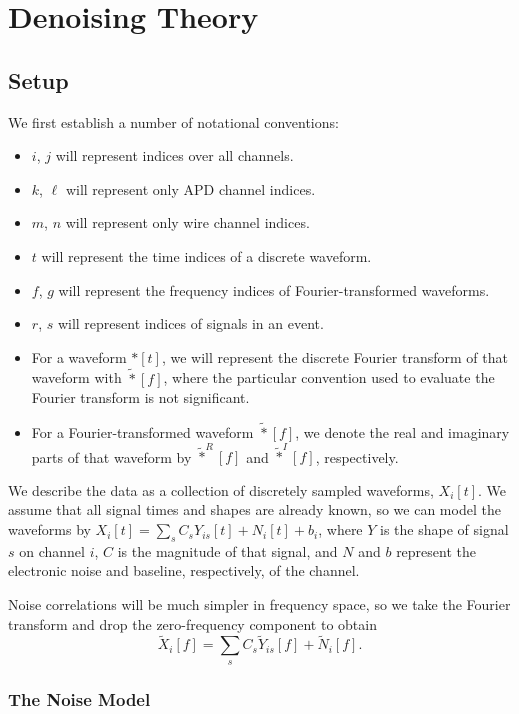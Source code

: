 
\renewcommand{\thechapter}{4}
\chapter{Denoising Theory}

\section{Setup}

We first establish a number of notational conventions:
\begin{itemize}
\item $i$, $j$ will represent indices over all channels.
\item $k$, $\ell$ will represent only APD channel indices.
\item $m$, $n$ will represent only wire channel indices.
\item $t$ will represent the time indices of a discrete waveform.
\item $f$, $g$ will represent the frequency indices of Fourier-transformed waveforms.
\item $r$, $s$ will represent indices of signals in an event.
\item For a waveform $*[t]$, we will represent the discrete Fourier transform of that waveform with $\widetilde{*}[f]$, where the particular convention used to evaluate the Fourier transform is not significant.
\item For a Fourier-transformed waveform $\widetilde{*}[f]$, we denote the real and imaginary parts of that waveform by $\widetilde{*}^R[f]$ and $\widetilde{*}^I[f]$, respectively.
\end{itemize}

We describe the data as a collection of discretely sampled waveforms, $X_i[t]$.  We assume that all signal times and shapes are already known, so we can model the waveforms by $X_i[t] = \sum_s C_{s}Y_{is}[t] + N_i[t] + b_i$, where $Y$ is the shape of signal $s$ on channel $i$, $C$ is the magnitude of that signal, and $N$ and $b$ represent the electronic noise and baseline, respectively, of the channel.

Noise correlations will be much simpler in frequency space, so we take the Fourier transform and drop the zero-frequency component to obtain \[\widetilde{X}_i[f] = \sum_s C_{s}\widetilde{Y}_{is}[f] + \widetilde{N}_i[f].\]

\subsection{The Noise Model}


